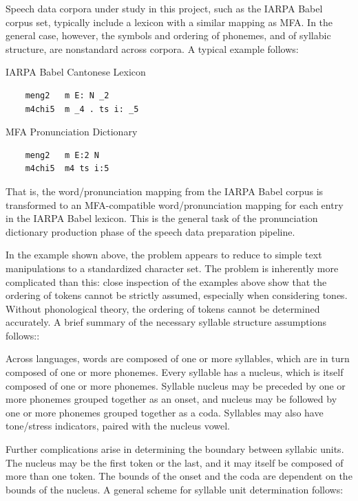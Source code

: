 \documentclass[11pt]{article}
\begin{document}
Speech data corpora under study in this project, such as the IARPA Babel corpus set, typically include a lexicon with a similar mapping as MFA. In the general case, however, the symbols and ordering of phonemes, and of syllabic structure, are nonstandard across corpora. A typical example follows:

\begin{multicols}{2}
  \begin{singlespace}
    IARPA Babel Cantonese Lexicon
    \begin{verbatim}
    meng2	m E: N _2
    m4chi5	m _4 . ts i: _5
    \end{verbatim}
  \end{singlespace}
  \begin{singlespace}
    MFA Pronunciation Dictionary
    \begin{verbatim}
    meng2	m E:2 N
    m4chi5	m4 ts i:5
    \end{verbatim}
  \end{singlespace}
\end{multicols}

That is, the word/pronunciation mapping from the IARPA Babel corpus is transformed to an MFA-compatible word/pronunciation mapping for each entry in the IARPA Babel lexicon. This is the general task of the pronunciation dictionary production phase of the speech data preparation pipeline.

In the example shown above, the problem appears to reduce to simple text manipulations to a standardized character set. The problem is inherently more complicated than this: close inspection of the examples above show that the ordering of tokens cannot be strictly assumed, especially when considering tones. Without phonological theory, the ordering of tokens cannot be determined accurately. A brief summary of the necessary syllable structure assumptions follows:\cite{fromkin_introduction_2006}:

Across languages, words are composed of one or more syllables, which are in turn composed of one or more phonemes. Every syllable has a nucleus, which is itself composed of one or more phonemes. Syllable nucleus may be preceded by one or more phonemes grouped together as an onset, and nucleus may be followed by one or more phonemes grouped together as a coda. Syllables may also have tone/stress indicators, paired with the nucleus vowel.

Further complications arise in determining the boundary between syllabic units. The nucleus may be the first token or the last, and it may itself be composed of more than one token. The bounds of the onset and the coda are dependent on the bounds of the nucleus. A general scheme for syllable unit determination follows:
\end{document}
